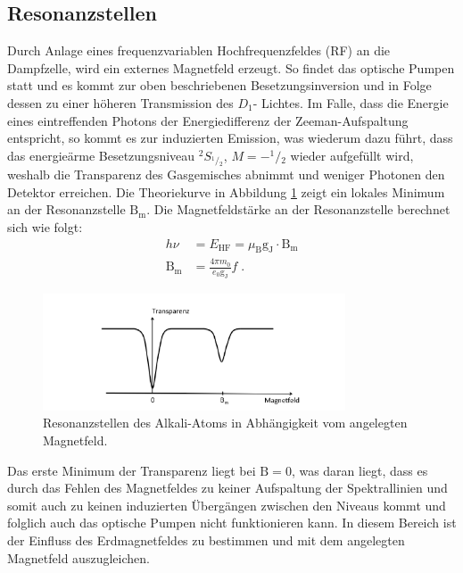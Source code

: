 \subsection{Resonanzstellen}
Durch Anlage eines frequenzvariablen Hochfrequenzfeldes (RF) an die Dampfzelle, wird ein externes Magnetfeld erzeugt. So findet das optische Pumpen statt und es kommt zur oben beschriebenen Besetzungsinversion und in Folge dessen zu einer höheren Transmission des $D_1$- Lichtes.
Im Falle, dass die Energie eines eintreffenden Photons der Energiedifferenz der Zeeman-Aufspaltung entspricht, so kommt es zur induzierten Emission, was wiederum dazu führt, dass das energieärme Besetzungsniveau ${}^2S_{{}^1\!/\!_2}$, $M=-^1\!/\!_2$ wieder aufgefüllt wird, weshalb die Transparenz des Gasgemisches abnimmt und weniger Photonen den Detektor erreichen. Die Theoriekurve in Abbildung \ref{abb:Resonanz} zeigt ein lokales Minimum an der Resonanzstelle $\text{B}_{\text{m}}$.
Die Magnetfeldstärke an der Resonanzstelle berechnet sich wie folgt:
\begin{align}
  \label{eq:2}
    h \nu &= E_{\text{HF}} = \mu_{\text{B}} \text{g}_{\text{J}} \cdot \text{B}_{\text{m}} \\
    \text{B}_{\text{m}} &= \frac{4\pi m_0}{e_0 \text{g}_{\text{J}}}f \; .
\end{align}
\FloatBarrier
\begin{figure}
    \centering
    \includegraphics[width=0.8\textwidth]{Resonanz.PNG}
    \caption{Resonanzstellen des Alkali-Atoms in Abhängigkeit vom angelegten Magnetfeld. \cite{Q1}}
    \label{abb:Resonanz}
\end{figure}
\FloatBarrier
Das erste Minimum der Transparenz liegt bei $\text{B}=0$, was daran liegt, dass es durch das Fehlen des Magnetfeldes zu keiner Aufspaltung der Spektrallinien und somit auch zu keinen induzierten Übergängen zwischen den Niveaus kommt und folglich auch das optische Pumpen nicht funktionieren kann.
In diesem Bereich ist der Einfluss des Erdmagnetfeldes zu bestimmen und mit dem angelegten Magnetfeld auszugleichen.

